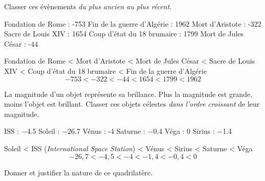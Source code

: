 \documentclass[../Cours.tex]{subfiles}
\begin{document}
\clearpage
\thispagestyle{empty}

\color{black}
\nomPrenom
\titreDScorrection

\begin{questions}
    \question Classer ces évènements \textit{du plus ancien au plus récent}.\vspace{-1em}
        \begin{multicols}{2}
        \subquestion Fondation de Rome : -753
        \subquestion Fin de la guerre d'Algérie : 1962
        \subquestion Mort d'Aristote : -322
        \subquestion Sacre de Louis XIV : 1654
        \subquestion Coup d'état du 18 brumaire : 1799
        \subquestion Mort de Jules César : -44
        \end{multicols} 

    {\color{rouge}
    Fondation de Rome < Mort d'Aristote < Mort de Jules César < Sacre de Louis XIV < Coup d'état du 18 brumaire < Fin de la guerre d'Algérie\\ 
    \[ -753 < -322 < -44 < 1654 < 1799 < 1962 \]
    }
    
    \question La magnitude d'un objet représente sa brillance. Plus la magnitude est grande, moins l'objet est brillant. Classer ces objets célestes \textit{dans l'ordre croissant} de leur magnitude.\vspace{-1em}
        \begin{multicols}{3}
        \subquestion ISS : \num{-4.5}
        \subquestion Soleil : \num{-26.7}
        \subquestion Vénus : -4
        \subquestion Saturne : \num{-0.4}
        \subquestion Véga : 0
        \subquestion Sirius : \num{-1.4}
        \end{multicols}
    
    {\color{rouge}
    Soleil < ISS (\textit{International Space Station}) < Vénus < Sirius < Saturne < Véga \\ 
    \[ -26{,}7 < -4{,}5 < -4 < -1{,}4 < -0{,}4 < 0 \]
    }

    \question Donner et justifier la nature de ce quadrilatère.

    \begin{centre}
    \end{centre}


\end{questions}
\end{document}
